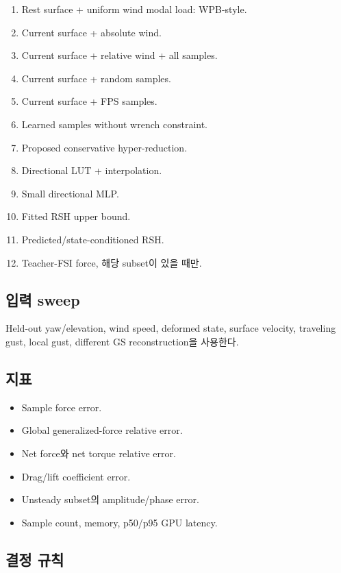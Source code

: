 \documentclass[11pt,a4paper]{article}
\begin{document}
\begin{enumerate}[leftmargin=1.7em]
  \item Rest surface + uniform wind modal load: WPB-style.
  \item Current surface + absolute wind.
  \item Current surface + relative wind + all samples.
  \item Current surface + random samples.
  \item Current surface + FPS samples.
  \item Learned samples without wrench constraint.
  \item Proposed conservative hyper-reduction.
  \item Directional LUT + interpolation.
  \item Small directional MLP.
  \item Fitted RSH upper bound.
  \item Predicted/state-conditioned RSH.
  \item Teacher-FSI force, 해당 subset이 있을 때만.
\end{enumerate}

\subsection*{입력 sweep}

Held-out yaw/elevation, wind speed, deformed state,
surface velocity, traveling gust, local gust,
different GS reconstruction을 사용한다.

\subsection*{지표}

\begin{itemize}[leftmargin=1.5em]
  \item Sample force error.
  \item Global generalized-force relative error.
  \item Net force와 net torque relative error.
  \item Drag/lift coefficient error.
  \item Unsteady subset의 amplitude/phase error.
  \item Sample count, memory, p50/p95 GPU latency.
\end{itemize}

\subsection*{결정 규칙}
\end{document}
